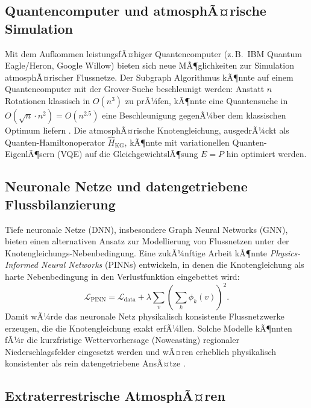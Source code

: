 ﻿\documentclass[a4paper,12pt]{article}
\theoremstyle{definition}
\begin{document}
\subsection{Quantencomputer und atmosphÃ¤rische Simulation}

Mit dem Aufkommen leistungsfÃ¤higer Quantencomputer (z.\,B.\ IBM Quantum
Eagle/Heron, Google Willow) bieten sich neue MÃ¶glichkeiten zur Simulation
atmosphÃ¤rischer Flussnetze. Der Subgraph Algorithmus kÃ¶nnte auf einem
Quanten\-computer mit der Grover-Suche beschleunigt werden: Anstatt $n$
Rotationen klassisch in $O(n^3)$ zu prÃ¼fen, kÃ¶nnte eine Quantensuche
in $O(\sqrt{n} \cdot n^2) = O(n^{2.5})$ eine Beschleunigung gegenÃ¼ber
dem klassischen Optimum liefern \cite{grover1996}. Die atmosphÃ¤rische
Knotengleichung, ausgedrÃ¼ckt als Quanten-Hamiltonoperator
$\hat{H}_\mathrm{KG}$, kÃ¶nnte mit variationellen Quanten-EigenlÃ¶sern
(VQE) auf die GleichgewichtslÃ¶sung $E = P$ hin optimiert werden.

\subsection{Neuronale Netze und datengetriebene Flussbilanzierung}

Tiefe neuronale Netze (DNN), insbesondere Graph Neural Networks (GNN),
bieten einen alternativen Ansatz zur Modellierung von Flussnetzen unter
der Knotengleichungs-Nebenbedingung. Eine zukÃ¼nftige Arbeit kÃ¶nnte
\emph{Physics-Informed Neural Networks} (PINNs) entwickeln, in denen die
Knotengleichung als harte Nebenbedingung in den Verlust\-funktion eingebettet
wird:
\[
  \mathcal{L}_\mathrm{PINN} = \mathcal{L}_\mathrm{data}
  + \lambda \sum_v \left(\sum_k \phi_k(v)\right)^2.
\]
Damit wÃ¼rde das neuronale Netz physikalisch konsistente Flussnetzwerke
erzeugen, die die Knotengleichung exakt erfÃ¼llen. Solche Modelle kÃ¶nnten
fÃ¼r die kurz\-fristige Wettervorhersage (Nowcasting) regionaler
Niederschlagsfelder eingesetzt werden und wÃ¤ren erheblich physikalisch
konsistenter als rein daten\-getriebene AnsÃ¤tze \cite{lecun2015}.

\subsection{Extraterrestrische AtmosphÃ¤ren}
\end{document}
